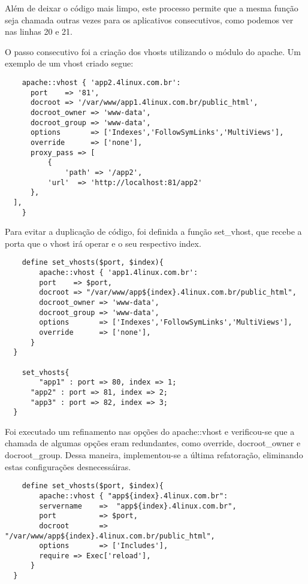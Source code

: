 \documentclass[12pt]{article}
\begin{document}
Além de deixar o código mais limpo, este processo permite que a mesma função seja chamada outras vezes para os
aplicativos consecutivos, como podemos ver nas linhas 20 e 21.

O passo consecutivo foi a criação dos vhosts utilizando o módulo do apache. Um exemplo de um vhost criado segue:


\begin{verbatim}
    apache::vhost { 'app2.4linux.com.br':
      port    => '81',
      docroot => '/var/www/app1.4linux.com.br/public_html',
      docroot_owner => 'www-data',
      docroot_group => 'www-data',
      options       => ['Indexes','FollowSymLinks','MultiViews'],
      override      => ['none'],
      proxy_pass => [
          {
              'path' => '/app2',
          'url'  => 'http://localhost:81/app2'
      },
  ],
    }
\end{verbatim}

Para evitar a duplicação de código, foi definida a função set\_vhost, que recebe a porta que o vhost irá operar e o
seu respectivo index.

\begin{verbatim}
    define set_vhosts($port, $index){
        apache::vhost { 'app1.4linux.com.br':
        port    => $port,
        docroot => "/var/www/app${index}.4linux.com.br/public_html",
        docroot_owner => 'www-data',
        docroot_group => 'www-data',
        options       => ['Indexes','FollowSymLinks','MultiViews'],
        override      => ['none'],
      }
  }

    set_vhosts{
        "app1" : port => 80, index => 1;
      "app2" : port => 81, index => 2;
      "app3" : port => 82, index => 3;
  }
\end{verbatim}

Foi executado um refinamento nas opções do apache::vhost e verificou-se que a chamada de algumas opções
eram redundantes, como override, docroot\_owner e docroot\_group. Dessa maneira, implementou-se  a última
refatoração, eliminando estas configurações desnecessáiras.


\begin{verbatim}
    define set_vhosts($port, $index){
        apache::vhost { "app${index}.4linux.com.br":
        servername    =>  "app${index}.4linux.com.br",
        port          => $port,
        docroot       => "/var/www/app${index}.4linux.com.br/public_html",
        options       => ['Includes'],
        require => Exec['reload'],
      }
  }
\end{verbatim}
\end{document}
